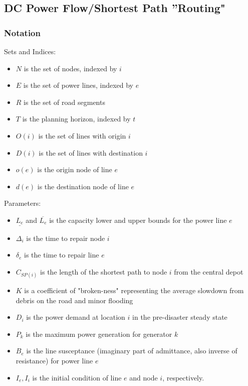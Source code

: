 \documentclass{article}
\begin{document}
	\subsection{DC Power Flow/Shortest Path ''Routing"}	

	\subsubsection{Notation}
Sets and Indices:
	\begin{itemize}
		\item $N$ is the set of nodes, indexed by $i$
		\item $E$ is the set of power lines, indexed by $e$
		\item $R$ is the set of road segments
		\item $T$ is the planning horizon, indexed by $t$
		\item $O(i)$ is the set of lines with origin $i$
		\item $D(i)$ is the set of lines with destination $i$
		\item $o(e)$ is the origin node of line $e$
		\item $d(e)$ is the destination node of line $e$
	\end{itemize}

Parameters:
	\begin{itemize}
		\item $\underline{L_e}$ and $\overline{L_e}$ is the capacity lower and upper bounds for the power line $e$
		\item $\Delta_{i}$ is the time to repair node $i$
		\item $\delta_{e}$ is the time to repair line $e$
		\item $C_{SP(i)}$ is the length of the shortest path to node $i$ from the central depot
		\item $K$ is a coefficient of "broken-ness" representing the average slowdown from debris on the road and minor flooding
		\item $D_i$ is the power demand at location $i$ in the pre-disaster steady state
		\item $P_k$ is the maximum power generation for generator $k$
		\item $B_e$ is the line susceptance (imaginary part of admittance, also inverse of resistance) for power line $e$
		\item $I_e, I_i$ is the initial condition of line $e$ and node $i$, respectively.
	\end{itemize}
\end{document}
